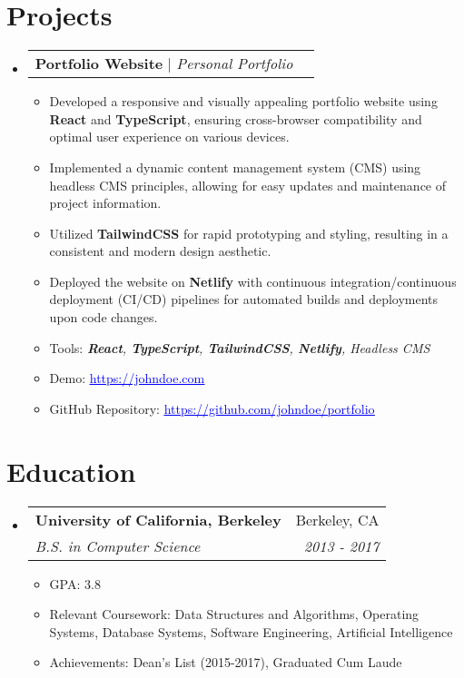 \documentclass[letterpaper,11pt]{article}
\makeatletter
\newcommand{\resumeItem}[1]{
  \item\small{
    {#1 \vspace{-2pt}}
  }
}
\newcommand{\resumeSubheading}[4]{
  \vspace{-2pt}\item
    \begin{tabular*}{0.97\textwidth}[t]{l@{\extracolsep{\fill}}r}
      \textbf{#1} & #2 \\
      \textit{\small#3} & \textit{\small #4} \\
    \end{tabular*}\vspace{-7pt}
}
\newcommand{\resumeProjectHeading}[2]{
    \item
    \begin{tabular*}{0.97\textwidth}{l@{\extracolsep{\fill}}r}
      \small#1 & #2 \\
    \end{tabular*}\vspace{-7pt}
}
\newcommand{\resumeSubHeadingListStart}{\begin{itemize}[leftmargin=0.15in, label={}]}
\newcommand{\resumeSubHeadingListEnd}{\end{itemize}}
\newcommand{\resumeItemListStart}{\begin{itemize}}
\newcommand{\resumeItemListEnd}{\end{itemize}\vspace{-5pt}}
\makeatother
\begin{document}
\section{Projects}
\resumeSubHeadingListStart
    \resumeProjectHeading
        {\textbf{Portfolio Website} $|$ \emph{Personal Portfolio}}{}
        \resumeItemListStart
            \resumeItem{Developed a responsive and visually appealing portfolio website using \textbf{React} and \textbf{TypeScript}, ensuring cross-browser compatibility and optimal user experience on various devices.}
            \resumeItem{Implemented a dynamic content management system (CMS) using headless CMS principles, allowing for easy updates and maintenance of project information.}
            \resumeItem{Utilized \textbf{TailwindCSS} for rapid prototyping and styling, resulting in a consistent and modern design aesthetic.}
            \resumeItem{Deployed the website on \textbf{Netlify} with continuous integration/continuous deployment (CI/CD) pipelines for automated builds and deployments upon code changes.}
            \resumeItem{Tools: \textit{\textbf{React}, \textbf{TypeScript}, \textbf{TailwindCSS}, \textbf{Netlify}, Headless CMS}}
            \resumeItem{Demo: \href{https://johndoe.com}{\textcolor{blue}{\underline{https://johndoe.com}}}}
            \resumeItem{GitHub Repository: \href{https://github.com/johndoe/portfolio}{\textcolor{blue}{\underline{https://github.com/johndoe/portfolio}}}}
        \resumeItemListEnd
\resumeSubHeadingListEnd

\section{Education}
\resumeSubHeadingListStart
    \resumeSubheading
      {University of California, Berkeley}{Berkeley, CA}
      {B.S. in Computer Science}{2013 - 2017}
      \resumeItemListStart
        \resumeItem{GPA: 3.8}
        \resumeItem{Relevant Coursework: Data Structures and Algorithms, Operating Systems, Database Systems, Software Engineering, Artificial Intelligence}
        \resumeItem{Achievements: Dean's List (2015-2017), Graduated Cum Laude}
      \resumeItemListEnd
\resumeSubHeadingListEnd
\end{document}
